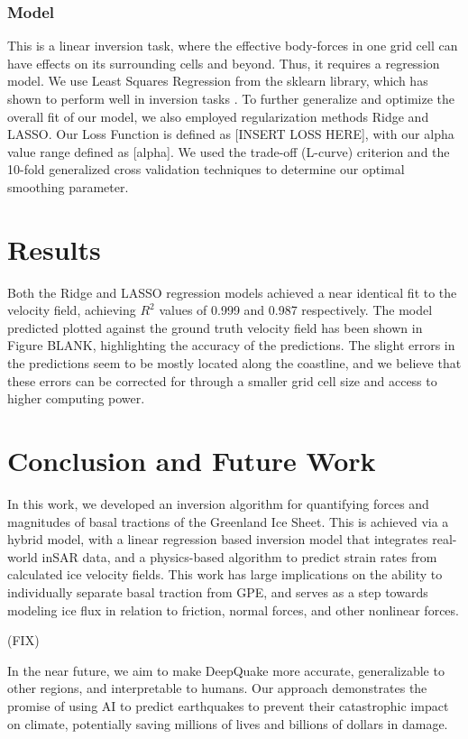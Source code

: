\documentclass{article}
\begin{document}
\subsubsection{Model}

This is a linear inversion task, where the effective body-forces in one grid cell can have effects on its surrounding cells and beyond. Thus, it requires a regression model. We use Least Squares Regression from the sklearn library, which has shown to perform well in inversion tasks \cite{lines_review_1984}. To further generalize and optimize the overall fit of our model, we also employed regularization methods Ridge and LASSO. Our Loss Function is defined as [INSERT LOSS HERE], with our alpha value range defined as [alpha]. We used the trade-off (L-curve) criterion and the 10-fold generalized cross validation techniques to determine our optimal smoothing parameter. 

\section{Results}

Both the Ridge and LASSO regression models achieved a near identical fit to the velocity field, achieving $R^{2}$ values of 0.999 and 0.987 respectively. The model predicted plotted against the ground truth velocity field has been shown in Figure BLANK, highlighting the accuracy of the predictions. The slight errors in the predictions seem to be mostly located along the coastline, and we believe that these errors can be corrected for through a smaller grid cell size and access to higher computing power. 


\section{Conclusion and Future Work}

In this work, we developed an inversion algorithm for quantifying forces and magnitudes of basal tractions of the Greenland Ice Sheet. This is achieved via a hybrid model, with a linear regression based inversion model that integrates real-world inSAR data, and a physics-based algorithm to predict strain rates from calculated ice velocity fields. This work has large implications on the ability to individually separate basal traction from GPE, and serves as a step towards modeling ice flux in relation to friction, normal forces, and other nonlinear forces.

(FIX)

In the near future, we aim to make DeepQuake more accurate, generalizable to other regions, and interpretable to
humans. Our approach demonstrates the promise of using AI to predict earthquakes to prevent their
catastrophic impact on climate, potentially saving millions of lives and billions of dollars in damage.
\end{document}
